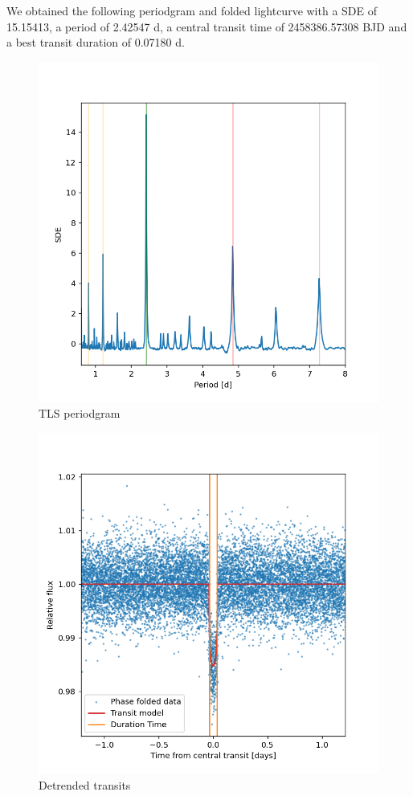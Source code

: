 \documentclass[a4paper,11pt,twocolumn]{article}
\begin{document}
We obtained the following periodgram and folded lightcurve with a SDE of 15.15413, a period of 2.42547 d, a central transit time of 
2458386.57308 BJD and a best transit duration of 0.07180 d.
 


\begin{figure}
   \centering
    \includegraphics[scale=0.3, angle=0]{../pictures/tess/sde.png}
    \caption{TLS periodgram}
\end{figure}

\begin{figure}
  \centering
    \includegraphics[scale=0.3, angle=0]{../pictures/tess/transit.png}
    \caption{Detrended transits}
\end{figure}
\end{document}
